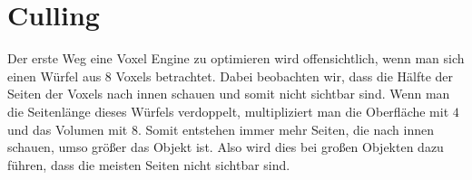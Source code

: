 \newcommand{\minipagespace}[1]{
	\begin{minipage}[c]{#1\textwidth}
		\ 
	\end{minipage}
}

\section{Culling}

Der erste Weg eine Voxel Engine zu optimieren wird
offensichtlich, wenn man sich einen Würfel aus $8$
Voxels betrachtet. Dabei beobachten wir, dass
die Hälfte der Seiten der Voxels nach innen schauen
und somit nicht sichtbar sind. Wenn man die
Seitenlänge dieses Würfels verdoppelt, multipliziert
man die Oberfläche mit $4$ und das Volumen mit $8$.
Somit entstehen immer mehr Seiten, die nach innen
schauen, umso größer das Objekt ist. Also wird
dies bei großen Objekten dazu führen, dass die
meisten Seiten nicht sichtbar sind.

